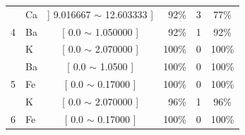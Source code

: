 \begin{table}[!h]
{\begin{tabular}{llcrcc}
                                             & Ca   & ] 9.016667 $\sim$  12.603333      ] & 92\%                               & 3 & 77\%\\  
\multirow{-4}{*}{4}                          & Ba    & [ 0.0 $\sim$ 1.050000    ]       & 92\%                               & 1 &  92\%\\  \hline                                            
                                            & K     & [ 0.0 $\sim$  2.070000     ]       & 100\%                               & 0 & 100\%\\  
                                            & Ba    & [ 0.0 $\sim$  1.0500     ]       & 100\%                               & 0 & 100\% \\   
\multirow{-2}{*}{5}                         & Fe    & [ 0.0 $\sim$  0.17000     ]       & 100\%                               & 0 & 100\% \\  \hline
                                            & K     & [ 0.0 $\sim$  2.070000     ]       & 96\%                               & 1 & 96\%\\  
\multirow{-2}{*}{6}                          & Fe    & [ 0.0 $\sim$  0.17000     ]       & 100\%                               & 0 & 100\% \\  \hline

\hline

\end{tabular}
}
\end{table}




